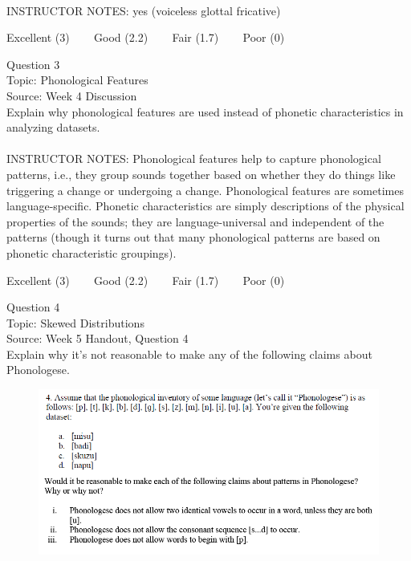 \documentclass[12pt]{article}
\begin{document}
~\\
INSTRUCTOR NOTES: yes (voiceless glottal fricative)


\vfill
Excellent (3) ~~~ Good (2.2) ~~~ Fair (1.7) ~~~ Poor (0)
\newpage

{\large Question 3}\\

Topic: Phonological Features\\
Source: Week 4 Discussion\\

Explain why phonological features are used instead of phonetic characteristics in analyzing datasets.\\


~\\
INSTRUCTOR NOTES: Phonological features help to capture phonological patterns, i.e., they group sounds together based on whether they do things like triggering a change or undergoing a change. Phonological features are sometimes language-specific. Phonetic characteristics are simply descriptions of the physical properties of the sounds; they are language-universal and independent of the patterns (though it turns out that many phonological patterns are based on phonetic characteristic groupings).


\vfill
Excellent (3) ~~~ Good (2.2) ~~~ Fair (1.7) ~~~ Poor (0)
\newpage

{\large Question 4}\\

Topic: Skewed Distributions\\
Source: Week 5 Handout, Question 4\\

Explain why it's not reasonable to make any of the following claims about Phonologese.\\

\begin{figure}[H]
\includegraphics{../images/Phonologese.png}
\end{figure}
\end{document}
